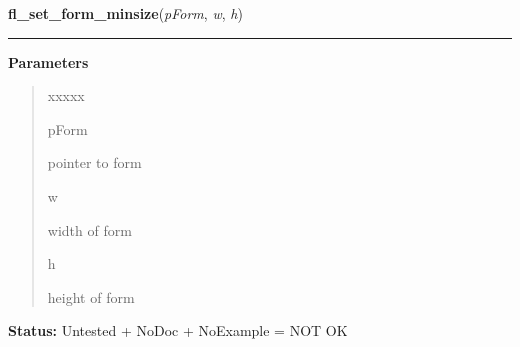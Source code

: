 \hspace{.8\funcindent}\begin{boxedminipage}{\funcwidth}

    \raggedright \textbf{fl\_set\_form\_minsize}(\textit{pForm}, \textit{w}, \textit{h})

    \vspace{-1.5ex}

    \rule{\textwidth}{0.5\fboxrule}
\setlength{\parskip}{2ex}
\setlength{\parskip}{1ex}
      \textbf{Parameters}
      \vspace{-1ex}

      \begin{quote}
        \begin{Ventry}{xxxxx}

          \item[pForm]

          pointer to form

          \item[w]

          width of form

          \item[h]

          height of form

        \end{Ventry}

      \end{quote}

\textbf{Status:} Untested + NoDoc + NoExample = NOT OK



    \end{boxedminipage}

    \label{xformslib:library:fl_set_form_maxsize}

    \vspace{0.5ex}

